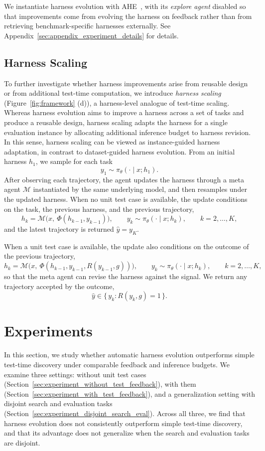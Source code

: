 \documentclass{article}
\begin{document}
We instantiate harness evolution with AHE~\citep{lin2026agentic}, with its \textit{explore agent} disabled so that improvements come from evolving the harness on feedback rather than from retrieving benchmark-specific harnesses externally. See Appendix~\ref{sec:appendix_experiment_details} for details.

\subsection{Harness Scaling}
\label{sec:method_harness_scaling}
To further investigate whether harness improvements arise from reusable design or from additional test-time computation, we introduce \emph{harness scaling}  (Figure~\ref{fig:framework} (d)), a harness-level analogue of test-time scaling. Whereas harness evolution aims to improve a harness across a set of tasks and produce a reusable design, harness scaling adapts the harness for a single evaluation instance by allocating additional inference budget to harness revision. In this sense, harness scaling can be viewed as instance-guided harness adaptation, in contrast to dataset-guided harness evolution. From an initial harness $h_1$, we sample for each task
\[
  y_1 \sim \pi_\theta(\cdot \mid x; h_1).
\]
After observing each trajectory, the agent updates the harness through a meta agent $\mathcal{M}$ instantiated by the same underlying model, and then resamples under the updated harness. When no unit test case is available, the update conditions on the task, the previous harness, and the previous trajectory,
\[
  h_k = \mathcal{M}\big(x,\ \Phi(h_{k-1}, y_{k-1})\big),
  \qquad
  y_k \sim \pi_\theta(\cdot \mid x; h_k),
  \qquad k = 2, \dots, K,
\]
and the latest trajectory is returned $\hat{y} = y_K$.

When a unit test case is available, the update also conditions on the outcome of the previous trajectory,
\[
  h_k = \mathcal{M}\big(x,\ \Phi(h_{k-1}, y_{k-1}, R(y_{k-1}, g))\big),
  \qquad
  y_k \sim \pi_\theta(\cdot \mid x; h_k),
  \qquad k = 2, \dots, K,
\]
so that the meta agent can revise the harness against the signal. We return any trajectory accepted by the outcome,
\[
\hat{y} \in \{\, y_k : R(y_k, g) = 1 \,\}.
\]

\section{Experiments}
In this section, we study whether automatic harness evolution outperforms simple test-time discovery under comparable feedback and inference budgets. We examine three settings: without unit test cases (Section~\ref{sec:experiment_without_test_feedback}), with them (Section~\ref{sec:experiment_with_test_feedback}), and a generalization setting with disjoint search and evaluation tasks (Section~\ref{sec:experiment_disjoint_search_eval}). Across all three, we find that harness evolution does not consistently outperform simple test-time discovery, and that its advantage does not generalize when the search and evaluation tasks are disjoint.
\end{document}
